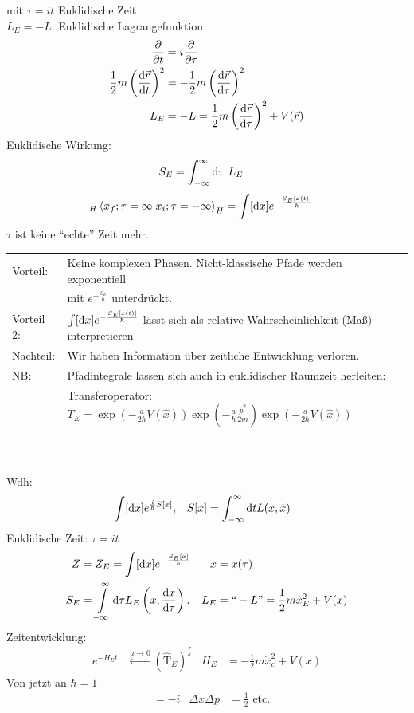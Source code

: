mit $\tau = i t$ Euklidische Zeit \\
$L_E = -L$: Euklidische Lagrangefunktion
	\begin{align*}
		\frac{\partial}{\partial t} &= i \frac{\partial}{\partial \tau} \\
		\frac{1}{2} m \left(\frac{\mathrm{d} \vec{r}}{\mathrm{d} t}\right)^2 &=
		-\frac{1}{2} m \left(\frac{\mathrm{d} \vec{r}}{\mathrm{d} \tau}\right)^2 \\
		L_E &= - L = \frac{1}{2} m \left(\frac{\mathrm{d} \vec{r}}{\mathrm{d} \tau}\right)^2 + V(\vec{r})
	\end{align*}
Euklidische Wirkung:
	\begin{align*}
		S_E &= \int_{-\infty}^{\infty} \mathrm{d} \tau ~L_E
	\end{align*}
	\begin{align*}
		{}_H\braket{x_f; \tau= \infty | x_i ; \tau= -\infty}_H &= 
		\int [\mathrm{d} x] e^{-\frac{S_E[x(t)]}{\hbar}}
	\end{align*}
$\tau$ ist keine ``echte'' Zeit mehr.\\

	\begin{tabular}{l l}
		Vorteil: & Keine komplexen Phasen. Nicht-klassische Pfade werden exponentiell \\
		 & mit $e^{-\frac{S_E}{\hbar}}$ unterdrückt.\\
		 Vorteil 2: & $\int [\mathrm{d} x] e^{-\frac{S_E[x(t)]}{\hbar}}$ lässt sich als relative Wahrscheinlichkeit (Maß) interpretieren \\
		 Nachteil: & Wir haben Information über zeitliche Entwicklung verloren. \\
		 NB: & Pfadintegrale lassen sich auch in euklidischer Raumzeit herleiten:\\
		 & Transferoperator: 
		 $T_E = \exp\left(-\frac{a}{2\hbar} V(\hat{x})\right) \exp\left(-\frac{a}{\hbar} \frac{\hat{p}^2}{2m}\right) \exp\left(-\frac{a}{2\hbar} V(\hat{x})\right)$
	\end{tabular}\\
\\	
Wdh:
	\begin{align*}
		&\int [\mathrm{d} x] e^{\frac{i}{\hbar} S[x]} ,& S[x] &= \int_{-\infty}^{\infty} \mathrm{d} t L(x, \dot{x}) 
	\end{align*}
Euklidische Zeit: $\tau = i t$
	\begin{align*}
		Z &= Z_E = \int [ \mathrm{d} x] e^{-\frac{S_E[x]}{\hbar}} & x &= x(\tau) \\
		S_E &= \int\limits_{-\infty}^{\infty} \mathrm{d} \tau L_E \left(x, \frac{\mathrm{d} x}{\mathrm{d} \tau}\right) ,&
		L_E &=``-L\text{''} = \frac{1}{2} m \dot{x}_E^2 +V(x)
	\end{align*}
Zeitentwicklung: 
	\begin{align*}
		e^{-H_E t} &\overset{a\rightarrow 0 }{\longleftarrow} \left(\hat{\mathrm{T}}_E\right)^{\frac{\tau}{a}} &
		H_E &= -\frac{1}{2} m \dot{x}_c^2 + V(x) 
	\end{align*}
Von jetzt an $\hbar = 1$
	\begin{align*}
		[\hat{x},\hat{p}] &= -i & 
		\Delta x \Delta p &= \frac{1}{2} \text{ etc.}
	\end{align*}


